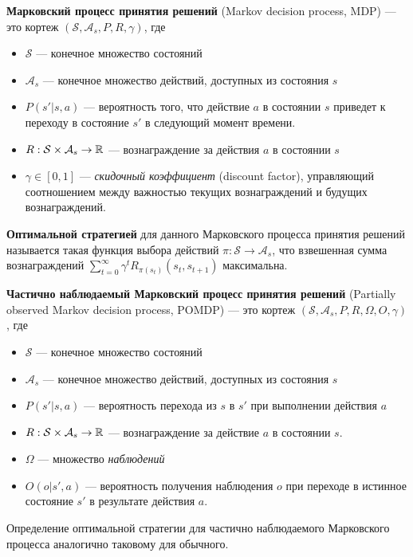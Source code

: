 \documentclass[specification, annotation]{itmo-student-thesis}
\begin{document}
\textbf{Марковский процесс принятия решений} (Markov decision process, MDP) ---
это кортеж
$(\mathcal{S}, \mathcal{A}_s, P, R, \gamma)$, где

\begin{itemize}
\item $\mathcal{S}$ --- конечное множество состояний
\item $\mathcal{A}_s$ --- конечное множество действий, доступных из состояния
  $s$
\item $P(s' | s, a)$ --- вероятность того, что действие $a$ в состоянии $s$
  приведет к переходу в состояние $s'$ в следующий момент времени.
\item $R : \mathcal{S} \times \mathcal{A}_s \rightarrow \Bbb{R}$ ---
  вознаграждение за действия $a$ в состоянии $s$
\item $\gamma \in [0, 1]$ --- \textit{скидочный коэффициент} (discount factor),
  управляющий соотношением между важностью текущих вознаграждений и будущих вознаграждений.
\end{itemize}

\textbf{Оптимальной стратегией} для данного Марковского процесса принятия
решений называется такая функция выбора действий $\pi : \mathcal{S} \rightarrow \mathcal{A}_s$,
что взвешенная сумма вознаграждений $\sum\limits_{t=0}^{\infty} {\gamma^t
  R_{\pi(s_t)}(s_t, s_{t+1})}$ максимальна.

\textbf{Частично наблюдаемый Марковский процесс принятия решений} (Partially
observed Markov decision process, POMDP) --- это кортеж
$(\mathcal{S}, \mathcal{A}_s, P, R, \Omega, O, \gamma)$, где
\begin{itemize}
\item $\mathcal{S}$ --- конечное множество состояний
\item $\mathcal{A}_s$ --- конечное множество действий, доступных из состояния $s$
\item $P(s' | s, a)$ --- вероятность перехода из $s$ в $s'$ при выполнении
  действия $a$
\item $R : \mathcal{S} \times \mathcal{A}_s \rightarrow \Bbb{R}$ ---
  вознаграждение за действие $a$ в состоянии $s$.
\item $\Omega$ --- множество \textit{наблюдений}
\item $O(o | s', a)$ --- вероятность получения наблюдения $o$ при переходе в
  истинное состояние $s'$ в результате действия $a$. 
\end{itemize}

Определение оптимальной стратегии для частично наблюдаемого Марковского процесса
аналогично таковому для обычного.
\end{document}
